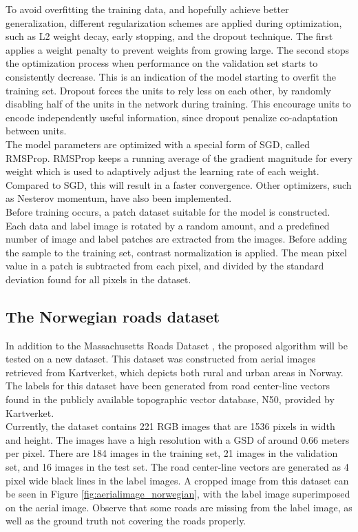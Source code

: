 To avoid overfitting the training data, and hopefully achieve better generalization, different regularization schemes are applied during optimization, such as L2 weight decay, early stopping, and the dropout technique. The first applies a weight penalty to prevent weights from growing large. The second stops the optimization process when performance on the validation set starts to consistently decrease. This is an indication of the model starting to overfit the training set. Dropout forces the units to rely less on each other, by randomly disabling half of the units in the network during training. This encourage units to encode independently useful information, since dropout penalize co-adaptation between units.\\

The model parameters are optimized with a special form of \ac{SGD}, called RMSProp. RMSProp keeps a running average of the gradient magnitude for every weight which is used to adaptively adjust the learning rate of each weight. Compared to \ac{SGD}, this will result in a faster convergence. Other optimizers, such as Nesterov momentum, have also been implemented.\\

Before training occurs, a patch dataset suitable for the model is constructed. Each data and label image is rotated by a random amount, and a predefined number of image and label patches are extracted from the images. Before adding the sample to the training set, contrast normalization is applied. The mean pixel value in a patch is subtracted from each pixel, and divided by the standard deviation found for all pixels in the dataset.\\

\subsection{The Norwegian roads dataset}
\label{sec:Norwegian_roads_dataset}
In addition to the Massachusetts Roads Dataset \citep{MnihThesis}, the proposed algorithm will be tested on a new dataset. This dataset was constructed from aerial images retrieved from Kartverket, which depicts both rural and urban areas in Norway. The labels for this dataset have been generated from road center-line vectors found in the publicly available topographic vector database, N50, provided by Kartverket. \\

Currently, the dataset contains 221 RGB images that are 1536 pixels in width and height. The images have a high resolution with a \ac{GSD} of around 0.66 meters per pixel. There are 184 images in the training set, 21 images in the validation set, and 16 images in the test set. The road center-line vectors are generated as 4 pixel wide black lines in the label images. A cropped image from this dataset can be seen in Figure \ref{fig:aerialimage_norwegian}, with the label image superimposed on the aerial image. Observe that some roads are missing from the label image, as well as the ground truth not covering the roads properly. \\


